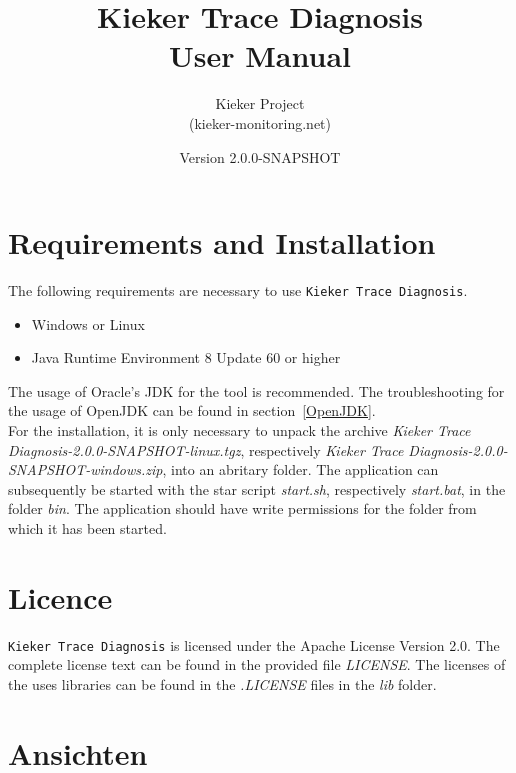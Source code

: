 \documentclass{article}
\begin{document}
  \newcommand{\version}[0]{2.0.0-SNAPSHOT}
  \newcommand{\KiekerTraceDiagnosis}[0]{\texttt{Kieker Trace Diagnosis}}
  \newcommand{\file}[1]{\textit{#1}}

  \title{Kieker Trace Diagnosis\\User Manual}
  \date{Version \version{}}
  \author{Kieker Project\\(kieker-monitoring.net)}

  \maketitle

  \section{Requirements and Installation}
  The following requirements are necessary to use \KiekerTraceDiagnosis{}.
  \begin{itemize}
    \item Windows or Linux
    \item Java Runtime Environment 8 Update 60 or higher
  \end{itemize}
  The usage of Oracle's JDK for the tool is recommended. The troubleshooting for the usage of OpenJDK can be found in section~\ref{OpenJDK}.\\

  For the installation, it is only necessary to unpack the archive \file{Kieker Trace Diagnosis-\version{}-linux.tgz}, respectively \file{Kieker Trace Diagnosis-\version{}-windows.zip}, into an abritary folder.
  The application can subsequently be started with the star script \file{start.sh}, respectively \file{start.bat}, in the folder \file{bin}.
  The application should have write permissions for the folder from which it has been started.

  \section{Licence}
  \KiekerTraceDiagnosis{} is licensed under the Apache License Version 2.0.
  The complete license text can be found in the provided file \file{LICENSE}.
  The licenses of the uses libraries can be found in the \file{.LICENSE} files in the \file{lib} folder.

  \section{Ansichten}
\end{document}

